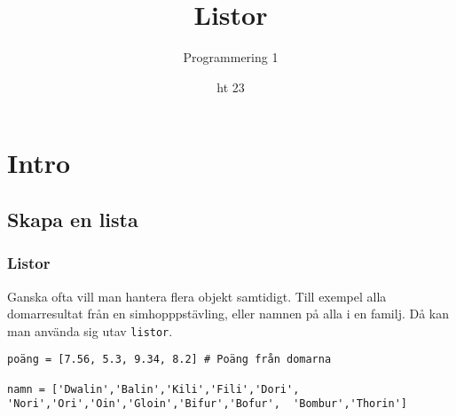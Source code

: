 \documentclass{beamer}
\begin{document}


\title{Listor}
\date{ht 23}
\author{Programmering 1}

\maketitle

\section{Intro}

\subsection{Skapa en lista}

\begin{frame}[fragile]
	\frametitle{Listor}
	
	Ganska ofta vill man hantera flera objekt samtidigt. Till exempel alla domarresultat från en simhopppstävling, eller namnen på alla i en familj. Då kan man använda sig utav \texttt{listor}.
	
	\begin{lstlisting}
poäng = [7.56, 5.3, 9.34, 8.2] # Poäng från domarna

namn = ['Dwalin','Balin','Kili','Fili','Dori',  'Nori','Ori','Oin','Gloin','Bifur','Bofur',  'Bombur','Thorin']
	\end{lstlisting}
\end{frame}
\end{document}
